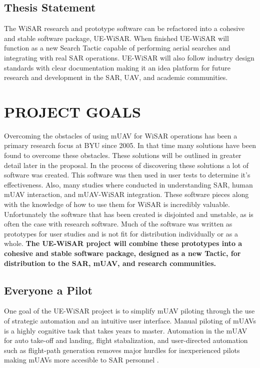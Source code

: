 \documentclass[12pt]{IEEEtran}
\begin{document}
\subsection{Thesis Statement}
The WiSAR research and prototype software can be refactored into a cohesive
and stable software package, UE-WiSAR.  When finished UE-WiSAR will function
as a new Search Tactic capable of performing aerial searches and integrating
with real SAR operations.
UE-WiSAR will also follow industry design standards with clear documentation
making it an idea platform for future research and development in the SAR, UAV,
and academic communities.

\section{PROJECT GOALS}
Overcoming the obstacles of using mUAV for WiSAR operations has been a primary
research focus at BYU since 2005.  In that time many solutions have been found
to overcome these obstacles.  These solutions will be outlined in greater detail
later in the proposal.  In the process of discovering these solutions a lot of
software was created.  This software was then used in user tests to determine
it's effectiveness.  Also, many studies where conducted in understanding SAR,
human mUAV interaction, and mUAV-WiSAR integration.  These software pieces along
with the knowledge of how to use them for WiSAR is incredibly valuable. 
Unfortunately the software that has been created is disjointed and unstable, as
is often the case with research software.
Much of the software was written as prototypes for user studies and is not fit
for distribution individually or as a whole.  \textbf{The UE-WiSAR project will
combine these prototypes into a cohesive and stable software package, designed
as a new Tactic, for distribution to the SAR, mUAV, and research communities.}

\subsection{Everyone a Pilot}
One goal of the UE-WiSAR project is to simplify mUAV piloting through the use of
strategic automation and an intuitive user interface.  Manual piloting of mUAVs
is a highly cognitive task that takes years to master.  Automation in the mUAV
for auto take-off and landing, flight stabalization, and user-directed
automation such as flight-path generation removes major hurdles for
inexperienced pilots making mUAVs more accesible to SAR personnel
\cite{cooper2007supporting}.
\end{document}
